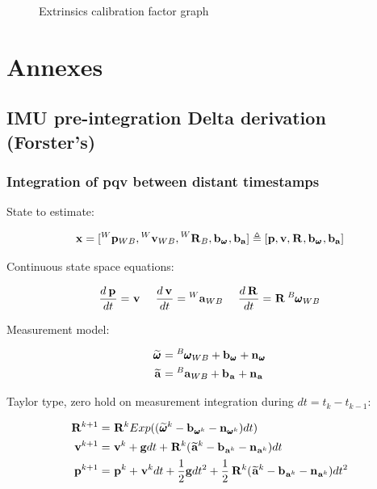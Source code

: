 \documentclass[11pt]{article}
\newcommand{\Rot}[2]{\prescript{#1}{}{\bfR}_{#2}}
\newcommand{\noise}{\bfn}
\newcommand{\posi}[2]{\prescript{#1}{}{\bfp}_{#2}}
\newcommand{\vel}[2]{\prescript{#1}{}{\bfv}_{#2}}
\newcommand{\acc}[2]{\prescript{#1}{}{\bfa}_{#2}}
\newcommand{\accm}[2]{\prescript{#1}{}{\widetilde{\bfa}}_{#2}}
\newcommand{\angvel}[2]{\prescript{#1}{}{\pmb{\omega}}_{#2}}
\newcommand{\angvelm}[2]{\prescript{#1}{}{\widetilde{\pmb{\omega}}}_{#2}}
\newcommand{\grav}{\bfg}
\begin{document}
\begin{figure}[ht]
\begin{minipage}[c]{.46\linewidth}
    \label{fig:factorgraph}
    \caption{Extrinsics calibration factor graph}
\end{minipage}
\end{figure}









\section{Annexes}
\subsection{IMU pre-integration Delta derivation (Forster's)}
\subsubsection{Integration of pqv between distant timestamps}
State to estimate:

\begin{equation*}
\bfx = [\posi{W}{WB}, \vel{W}{WB}, \Rot{W}{B}, \bfb_{\angvel{}{}}, \bfb_{\bfa}]
\triangleq 
[\bfp, \bfv, \Rot{}{}, \bfb_{\angvel{}{}}, \bfb_{\bfa}] 
\end{equation*}

Continuous state space equations:

\begin{equation*}
\frac{d\posi{}{}}{dt} = \vel{}{}  ~~~~ \frac{d\vel{}{}}{dt} = \acc{W}{WB} ~~~~ \frac{d\Rot{}{}}{dt} = \Rot{}{} \angvel{B}{WB} 
\end{equation*}

Measurement model:

\begin{equation*}
\begin{split}
\angvelm{}{} &= \angvel{B}{WB} + \bfb_{\angvel{}{}} + \noise_{\angvel{}{}} 
\\
\accm{}{}    &= \acc{B}{WB} + \bfb_{\acc{}{}} + \noise_{\acc{}{}} 
\end{split}
\end{equation*}


Taylor type, zero hold on measurement integration during $dt = t_k - t_{k-1}$:

\begin{equation*}
\begin{split}
\Rot{}{}^{k+1}  &= \Rot{}{}^{k}Exp((\angvelm{}{}^k - \bfb_{\angvel{}{}^k} - \noise_{\angvel{}{}^k})dt)
\\
\vel{}{}^{k+1}  &= \vel{}{}^{k} + \grav dt + \Rot{}{}^{k}(\accm{}{}^k - \bfb_{\acc{}{}^k} - \noise_{\acc{}{}^k})dt
\\
\posi{}{}^{k+1} &= \posi{}{}^{k} + \vel{}{}^{k}dt + \frac{1}{2}\grav dt^2 
+ \frac{1}{2}\Rot{}{}^{k}(\accm{}{}^k - \bfb_{\acc{}{}^k} - \noise_{\acc{}{}^k})dt^2
\end{split}
\end{equation*}
\end{document}
